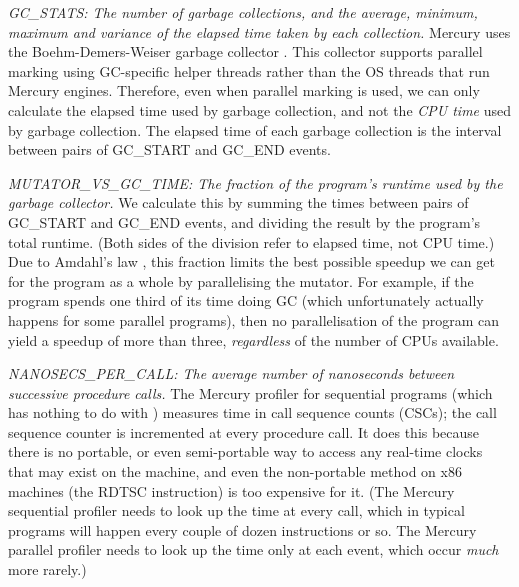 
\emph{GC\_STATS: The number of garbage collections,
and the average, minimum, maximum and variance
of the elapsed time taken by each collection.}
Mercury uses the Boehm-Demers-Weiser garbage collector \citep{boehm:1988:gc}.
This collector supports parallel marking using GC-specific helper threads
rather than the OS threads that run Mercury engines.
Therefore, even when parallel marking is used,
we can only calculate the elapsed time used by garbage collection,
and not the \emph{CPU time} used by garbage collection.
The elapsed time of each garbage collection
is the interval between pairs of GC\_START and GC\_END events.

\emph{MUTATOR\_VS\_GC\_TIME:
The fraction of the program's runtime used by the garbage collector.}
We calculate this by summing the times
between pairs of GC\_START and GC\_END events,
and dividing the result by the program's total runtime.
(Both sides of the division refer to elapsed time, not CPU time.)
Due to Amdahl's law \citep{amdahl:1967:law},
this fraction limits the best possible speedup we can get
for the program as a whole by parallelising the mutator.
For example, if the program spends one third of its time doing GC
(which unfortunately actually happens for some parallel programs),
then no parallelisation of the program can yield a speedup of more than three,
\emph{regardless} of the number of CPUs available.

\emph{NANOSECS\_PER\_CALL:
The average number of nanoseconds between successive procedure calls.}
The Mercury profiler for sequential programs \citep{conway:2001:mercury-deep}
(which has nothing to do with \tscope)
measures time in call sequence counts (CSCs);
the call sequence counter is incremented at every procedure call.
It does this because there is no portable, or even semi-portable way
to access any real-time clocks that may exist on the machine,
and even the non-portable method on x86 machines (the RDTSC instruction)
is too expensive for it.
(The Mercury sequential profiler needs to look up the time at every call,
which in typical programs will happen every couple of dozen instructions or so.
The Mercury parallel profiler needs to look up the time only at each event,
which occur \emph{much} more rarely.)

